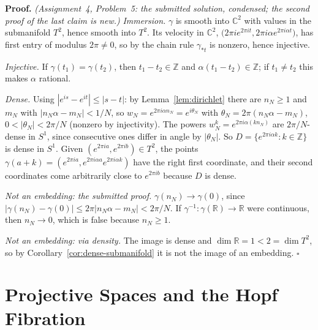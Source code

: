 \documentclass[11pt]{report}
\renewenvironment{proof}[1][Proof]{\noindent\textbf{#1.} }{\hfill$\square$\par\vspace{5pt}}
\begin{document}
\begin{proof}
\textit{(Assignment~4, Problem~5: the submitted solution, condensed; the second proof of the last claim is new.)} \emph{Immersion.} $\gamma$ is smooth into $\mathbb{C}^2$ with values in the submanifold $T^2$, hence smooth into $T^2$. Its velocity in $\mathbb{C}^2$, $\big(2\pi i e^{2\pi i t}, 2\pi i\alpha e^{2\pi i \alpha t}\big)$, has first entry of modulus $2\pi \ne 0$, so by the chain rule $\gamma_{*t}$ is nonzero, hence injective.

\emph{Injective.} If $\gamma(t_1) = \gamma(t_2)$, then $t_1 - t_2 \in \mathbb{Z}$ and $\alpha(t_1 - t_2) \in \mathbb{Z}$; if $t_1 \ne t_2$ this makes $\alpha$ rational.

\emph{Dense.} Using $|e^{is} - e^{it}| \le |s - t|$: by Lemma~\ref{lem:dirichlet} there are $n_N \ge 1$ and $m_N$ with $|n_N\alpha - m_N| < 1/N$, so $w_N = e^{2\pi i \alpha n_N} = e^{i\theta_N}$ with $\theta_N = 2\pi(n_N\alpha - m_N)$, $0 < |\theta_N| < 2\pi/N$ (nonzero by injectivity). The powers $w_N^k = e^{2\pi i \alpha (k n_N)}$ are $2\pi/N$-dense in $S^1$, since consecutive ones differ in angle by $|\theta_N|$. So $D = \{e^{2\pi i\alpha k} : k \in \mathbb{Z}\}$ is dense in $S^1$. Given $(e^{2\pi i a}, e^{2\pi i b}) \in T^2$, the points $\gamma(a + k) = (e^{2\pi i a}, e^{2\pi i \alpha a} e^{2\pi i \alpha k})$ have the right first coordinate, and their second coordinates come arbitrarily close to $e^{2\pi i b}$ because $D$ is dense.

\emph{Not an embedding: the submitted proof.} $\gamma(n_N) \to \gamma(0)$, since $|\gamma(n_N) - \gamma(0)| \le 2\pi|n_N\alpha - m_N| < 2\pi/N$. If $\gamma^{-1} : \gamma(\mathbb{R}) \to \mathbb{R}$ were continuous, then $n_N \to 0$, which is false because $n_N \ge 1$.

\emph{Not an embedding: via density.} The image is dense and $\dim \mathbb{R} = 1 < 2 = \dim T^2$, so by Corollary~\ref{cor:dense-submanifold} it is not the image of an embedding.
\end{proof}


\section{Projective Spaces and the Hopf Fibration}\label{sec:ex-hopf}
\end{document}
